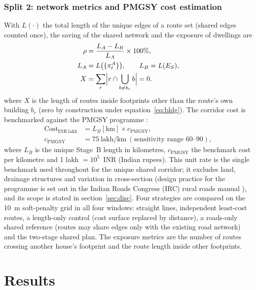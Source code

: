 \documentclass[preprint,12pt]{elsarticle}
\begin{document}
\subsubsection{Split 2: network metrics and PMGSY cost estimation}\label{sec:eval}
With $L(\cdot)$ the total length of the unique edges of a route set (shared edges counted once), the saving of the shared network and the exposure of dwellings are
\begin{equation}
\begin{aligned}
\rho&=\frac{L_A-L_B}{L_A}\times100\%,\\
L_A&=L\bigl(\{\pi_t^A\}\bigr),\qquad L_B=L(E_S),\\
X&=\sum_{r}\Bigl|r\cap\bigcup_{b\ne b_r}b\Bigr|=0.
\end{aligned}
\label{eq:saving}
\end{equation}
where $X$ is the length of routes inside footprints other than the route's own building $b_r$ (zero by construction under equation~\ref{eq:bldg}). The corridor cost is benchmarked against the PMGSY programme \cite{pmgsy}:
\begin{equation}
\begin{aligned}
\mathrm{Cost}_{\mathrm{INR\ lakh}}&=L_B[\mathrm{km}]\times c_{\mathrm{PMGSY}},\\
c_{\mathrm{PMGSY}}&=75\ \text{lakh/km}\ (\text{sensitivity range }60\text{--}90),
\end{aligned}
\label{eq:cost}
\end{equation}
where $L_B$ is the unique Stage~B length in kilometres, $c_{\mathrm{PMGSY}}$ the benchmark cost per kilometre and 1 lakh $=10^{5}$~INR (Indian rupees). This unit rate is the single benchmark used throughout for the unique shared corridor; it excludes land, drainage structures and variation in cross-section (design practice for the programme is set out in the Indian Roads Congress (IRC) rural roads manual \cite{irc2002sp20}), and its scope is stated in section~\ref{sec:disc}. Four strategies are compared on the 10~m soft-penalty grid in all four windows: straight lines, independent least-cost routes, a length-only control (cost surface replaced by distance), a roads-only shared reference (routes may share edges only with the existing road network) and the two-stage shared plan. The exposure metrics are the number of routes crossing another house's footprint and the route length inside other footprints.

\FloatBarrier
\section{Results}\label{sec:results}
\end{document}
